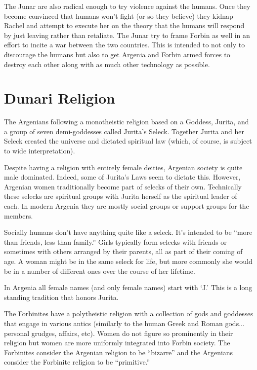 The Junar are also radical enough to try violence against the humans. Once they become convinced
that humans won't fight (or so they believe) they kidnap Rachel and attempt to execute her on
the theory that the humans will respond by just leaving rather than retaliate. The Junar try to
frame Forbin as well in an effort to incite a war between the two countries. This is intended to
not only to discourage the humans but also to get Argenia and Forbin armed forces to destroy
each other along with as much other technology as possible.

\section{Dunari Religion}

The Argenians following a monotheistic religion based on a Goddess, Jurita, and a group of
seven demi-goddesses called Jurita's Seleck. Together Jurita and her Seleck created the universe
and dictated spiritual law (which, of course, is subject to wide interpretation).

Despite having a religion with entirely female deities, Argenian society is quite male
dominated. Indeed, some of Jurita's Laws seem to dictate this. However, Argenian women
traditionally become part of selecks of their own. Technically these selecks are spiritual
groups with Jurita herself as the spiritual leader of each. In modern Argenia they are mostly
social groups or support groups for the members.

Socially humans don't have anything quite like a seleck. It's intended to be ``more than
friends, less than family.'' Girls typically form selecks with friends or sometimes with others
arranged by their parents, all as part of their coming of age. A woman might be in the same
seleck for life, but more commonly she would be in a number of different ones over the course of
her lifetime.

In Argenia all female names (and only female names) start with `J.' This is a long standing
tradition that honors Jurita.

The Forbinites have a polytheistic religion with a collection of gods and goddesses that engage
in various antics (similarly to the human Greek and Roman gods... personal grudges, affairs,
etc). Women do not figure so prominently in their religion but women are more uniformly
integrated into Forbin society. The Forbinites consider the Argenian religion to be ``bizarre''
and the Argenians consider the Forbinite religion to be ``primitive.''

